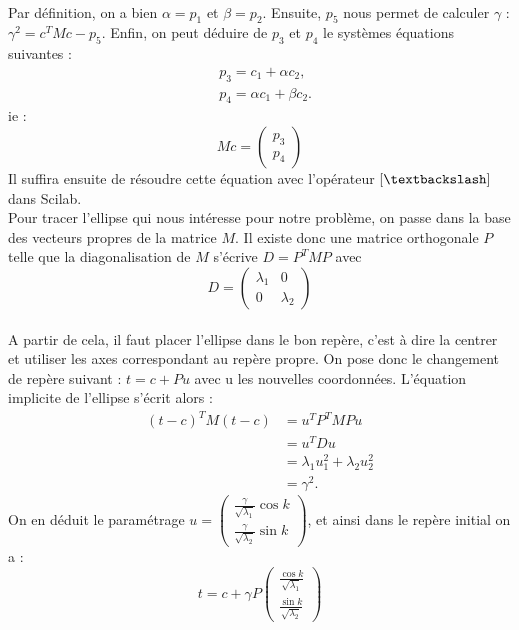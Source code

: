          \\Par définition, on a bien $\alpha = p_1$ et $\beta = p_2$. Ensuite, $p_5$ nous permet de calculer $\gamma$ : $\gamma^2 = c^TMc-p_5$. Enfin, on peut déduire de $p_3$ et $p_4$ le systèmes équations suivantes :
         \begin{align*}
         &p_3 = c_1 + \alpha c_2,\\
         &p_4 = \alpha c_1 + \beta c_2.
         \end{align*}
         ie : 
         $$
         Mc=\begin{pmatrix}
             p_3\\p_4
         \end{pmatrix}
         $$
         Il suffira ensuite de résoudre cette équation avec l'opérateur $[\textbackslash]$ dans Scilab.\\
         Pour tracer l'ellipse qui nous intéresse pour notre problème, on passe dans la base des vecteurs propres de la matrice $M$. Il existe donc une matrice orthogonale $P$ telle que la diagonalisation de $M$ s'écrive $D=P^TMP$ avec 
         $$
         D = \begin{pmatrix}
             \lambda_1&0\\
             0&\lambda_2
         \end{pmatrix}
         $$\\
         A partir de cela, il faut placer l'ellipse dans le bon repère, c'est à dire la centrer et utiliser les axes correspondant au repère propre. On pose donc le changement de repère suivant : $t=c+Pu$ avec u les nouvelles coordonnées. L'équation implicite de l'ellipse s'écrit alors : 
         \begin{align*}
             (t-c)^TM(t-c)&=u^TP^TMPu\\
             &=u^TDu\\
             &=\lambda_1u_1^2+\lambda_2u_2^2\\
             &=\gamma^2.
         \end{align*}
         On en déduit le paramétrage $u=\begin{pmatrix}
             \frac{\gamma}{\sqrt{\lambda_1}} \cos{k}\\
              \frac{\gamma}{\sqrt{\lambda_2}} \sin{k}
         \end{pmatrix}$, et ainsi dans le repère initial on a :\newpage
         $$
          t = c + \gamma P\begin{pmatrix}
              \frac{\cos{k}}{\sqrt{\lambda_1}}\\
              \frac{\sin{k}}{\sqrt{\lambda_2}}
          \end{pmatrix}
         $$
